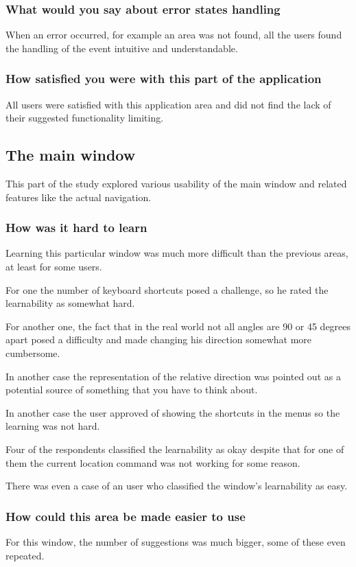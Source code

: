 \documentclass[nolof,digital]{fithesis3}
\begin{document}
\subsubsection{What would you say about error states handling}
When an error occurred, for example an area was not found, all the users found the handling of the event intuitive and understandable.
\subsubsection{How satisfied you were with this part of the application}
All users were satisfied with this application area and did not find the lack of their suggested functionality limiting.
\subsection{The main window}
This part of the study explored various usability of the main window and related features like the actual navigation.
\subsubsection{How was it hard to learn}
Learning this particular window was much more difficult than the previous areas, at least for some users.

For one the number of keyboard shortcuts posed a challenge, so he rated the learnability as somewhat hard.

For another one, the fact that in the real world not all angles are 90 or 45 degrees apart posed a difficulty and made changing his direction somewhat more cumbersome.

In another case the representation of the relative direction was pointed out as a potential source of something that you have to think about.

In another case the user approved of showing the shortcuts in the menus so the learning was not hard.

Four of the respondents classified the learnability as okay despite that for one of them the current location command was not working for some reason.

There was even a case of an user who classified the window's learnability as easy.
\subsubsection{How could this area be made easier to use}
For this window, the number of suggestions was much bigger, some of these even repeated.
\end{document}
